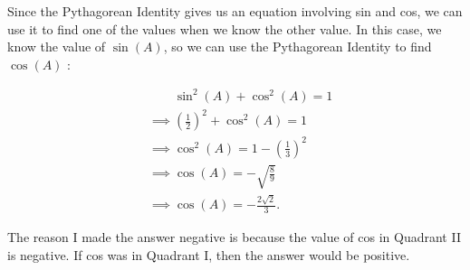 \begin{solution}
	\label{sol:find_cos}

	Since the Pythagorean Identity gives us an equation involving sin and cos, we
	can use it to find one of the values when we know the other value. In this
	case, we know the value of $\sin (A)$, so we can use the Pythagorean Identity
	to find $\cos (A)$ :

	\begin{align*}
		 & \qquad\sin^{2} (A) + \cos^{2} (A) = 1                    \\
		 & \implies \left(\frac{1}{2}\right)^{2} + \cos^{2} (A) = 1 \\
		 & \implies \cos^{2} (A) = 1 - \left(\frac{1}{3}\right)^{2} \\
		 & \implies \cos (A) = - \sqrt{\frac{8}{9}}                 \\
		 & \implies \cos (A) = -\frac{2\sqrt{2}}{3}
		.\end{align*}

	The reason I made the answer negative is because the value of cos in Quadrant
	II is negative. If cos was in Quadrant I, then the answer would be positive.
\end{solution}

